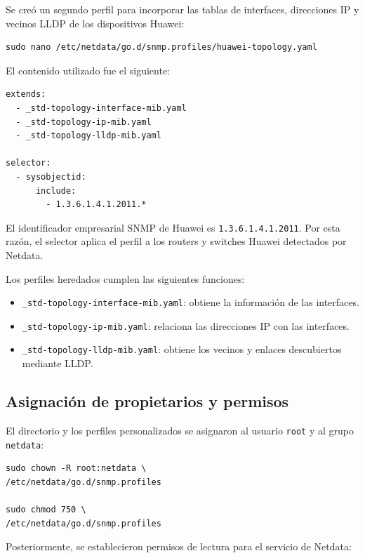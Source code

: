 Se creó un segundo perfil para incorporar las tablas de interfaces, direcciones IP y vecinos LLDP de los dispositivos Huawei:

\begin{lstlisting}[style=terminal]
sudo nano /etc/netdata/go.d/snmp.profiles/huawei-topology.yaml
\end{lstlisting}

El contenido utilizado fue el siguiente:

\begin{lstlisting}[style=terminal]
extends:
  - _std-topology-interface-mib.yaml
  - _std-topology-ip-mib.yaml
  - _std-topology-lldp-mib.yaml

selector:
  - sysobjectid:
      include:
        - 1.3.6.1.4.1.2011.*
\end{lstlisting}

El identificador empresarial SNMP de Huawei es \texttt{1.3.6.1.4.1.2011}. Por esta razón, el selector aplica el perfil a los routers y switches Huawei detectados por Netdata.

Los perfiles heredados cumplen las siguientes funciones:

\begin{itemize}
    \item \texttt{\_std-topology-interface-mib.yaml}: obtiene la información de las interfaces.
    \item \texttt{\_std-topology-ip-mib.yaml}: relaciona las direcciones IP con las interfaces.
    \item \texttt{\_std-topology-lldp-mib.yaml}: obtiene los vecinos y enlaces descubiertos mediante LLDP.
\end{itemize}

\subsection{Asignación de propietarios y permisos}

El directorio y los perfiles personalizados se asignaron al usuario \texttt{root} y al grupo \texttt{netdata}:

\begin{lstlisting}[style=terminal]
sudo chown -R root:netdata \
/etc/netdata/go.d/snmp.profiles

sudo chmod 750 \
/etc/netdata/go.d/snmp.profiles
\end{lstlisting}

Posteriormente, se establecieron permisos de lectura para el servicio de Netdata:

